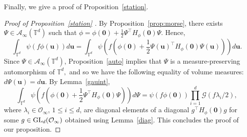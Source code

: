 \documentclass[10pt]{amsart}
\theoremstyle{plain}
\theoremstyle{plain}
\newtheorem{lemma}[theorem]{Lemma}
\renewcommand{\vec}[1]{\mathbf{#1}}
\theoremstyle{remark}
\theoremstyle{definition}
\renewcommand{\hat}{\widehat}
\newcommand{\Ki}{K_\infty}
\newcommand{\GL}{\textup{GL}}
\newcommand{\TT}{\mathbb{T}}
\newcommand{\cA}{\mathcal{A}}
\newcommand{\cO}{\mathcal{O}}
\newcommand{\cG}{\mathcal{G}}
\begin{document}
Finally, we give a proof of Proposition~\ref{station}.
\begin{proof}[Proof of Proposition~\ref{station} ]
By Proposition~\ref{prop:morse}, there exists $\Psi \in \cA_{\infty}(\TT^d)$ such that $\phi=\phi(\vec{0})+\frac{1}{2}\Psi^{\intercal}H_{\phi}(\vec{0})\Psi.$ Hence,
\[
\int_{\TT^d}\psi(f\phi(\vec{u}))d\vec{u}=\int_{\TT^d}\psi(f(\phi(\vec{0})+\frac{1}{2}\Psi(\vec{u})^{\intercal}H_{\phi}(\vec{0})\Psi(\vec{u})))d\vec{u}.
\]
Since $\Psi\in \cA_{\infty}(\TT^d)$, Proposition~\ref{auto} implies that $\Psi$ is a measure-preserving automorphism of $\TT^d,$ and so we have the following equality of volume measures: $d\Psi(\vec{u})=d\vec{u}$. By Lemma~\ref{gauint}, 
\[
\int_{\TT^d}\psi(f(\phi(\vec{0})+\frac{1}{2}\Psi^{\intercal}H_{\phi}(\vec{0})\Psi))d\Psi=\psi(f \phi(\vec{0})) \prod_{i=1}^{d}\cG (f\lambda_i/2),
\]
where $\lambda_i \in \cO_{\infty}$, $1 \leq i\leq d$, are diagonal elements of a diagonal $g^{\intercal}H_{\phi}(\vec{0})g$ for some $g\in \GL_d(\cO_{\infty})$ obtained using Lemma~\ref{diag}. This concludes the proof of our proposition.
\end{proof}
\end{document}
